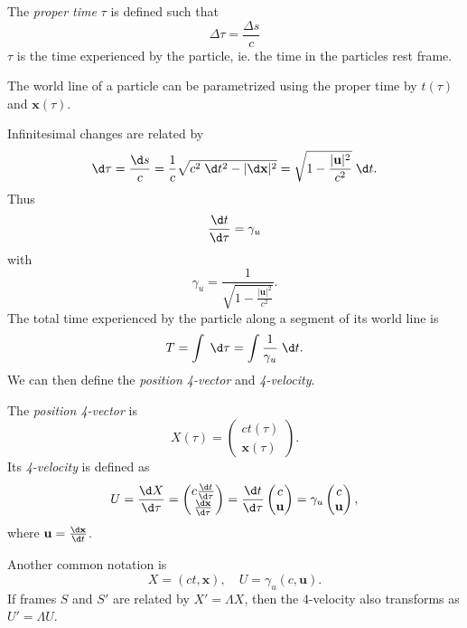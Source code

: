 \documentclass[a4paper]{article}
\begin{document}
\begin{defi}
  The \emph{proper time} $\tau$ is defined such that
  \[
    \Delta \tau = \frac{\Delta s}{c}
  \]
  $\tau$ is the time experienced by the particle, ie. the time in the particles rest frame.
\end{defi}
The world line of a particle can be parametrized using the proper time by $t(\tau)$ and $\mathbf{x}(\tau)$.
\begin{center}
\end{center}
Infinitesimal changes are related by
\[
  \d \tau = \frac{\d s}{c} = \frac{1}{c}\sqrt{c^2\;\d t^2 - |\d \mathbf{x}|^2} = \sqrt{1 - \frac{|\mathbf{u}|^2}{c^2}}\;\d t.
\]
Thus
\[
  \frac{\d t}{\d \tau} = \gamma_u
\]
with
\[
  \gamma_u = \frac{1}{\sqrt{1 - \frac{|\mathbf{u}|^2}{c^2}}}.
\]
The total time experienced by the particle along a segment of its world line is
\[
  T = \int \;\d \tau = \int\frac{1}{\gamma_u}\;\d t.
\]
We can then define the \emph{position 4-vector} and \emph{4-velocity}.
\begin{defi}
  The \emph{position 4-vector} is
  \[
    X(\tau) =
    \begin{pmatrix}
      ct(\tau)\\
      \mathbf{x}(\tau)
    \end{pmatrix}.
  \]
  Its \emph{4-velocity} is defined as
  \[
    U = \frac{\d X}{\d \tau} =
    \begin{pmatrix}
      c\frac{\d t}{\d \tau}\\
      \frac{\d \mathbf{x}}{\d \tau}
    \end{pmatrix}
    = \frac{\d t}{\d \tau}
    \begin{pmatrix}
      c\\
      \mathbf{u}
    \end{pmatrix} = \gamma_u
    \begin{pmatrix}
      c\\
      \mathbf{u}
    \end{pmatrix},
  \]
  where $\mathbf{u} = \frac{\d \mathbf{x}}{\d t}$.
\end{defi}
Another common notation is
\[
  X = (ct, \mathbf{x}),\quad U = \gamma_u (c, \mathbf{u}).
\]
If frames $S$ and $S'$ are related by $X' = \Lambda X$, then the 4-velocity also transforms as $U' = \Lambda U$.
\end{document}
